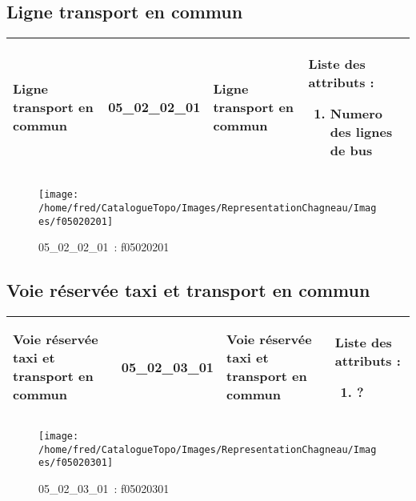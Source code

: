 \documentclass[12pt,titlepage]{book}
\begin{document}
\subsection{Ligne transport en commun}
\noindent
\vspace{\baselineskip}

\renewcommand{\arraystretch}{1.2}
\begin{supertabular}{|p{10cm}|c|p{13cm}|p{12cm}|}
 Ligne transport en commun & 05\_02\_02\_01 & Ligne transport en commun & Liste des attributs :
\begin{enumerate}
  \item Numero des lignes de bus\end{enumerate}
\\
\hline
\end{supertabular}
\begin{figure}[h!]
  \hfill         %
  \begin{minipage}[t]{3cm}
    \begin{center}
      \texttt{[image: /home/fred/CatalogueTopo/Images/RepresentationChagneau/Images/f05020201]}
      \caption[~05\_02\_02\_01]{\small{05\_02\_02\_01~:} \tiny{f05020201}}\label{f05020201}
    \end{center}
  \end{minipage}
\end{figure}


\subsection{Voie réservée taxi et transport en commun}
\noindent
\vspace{\baselineskip}

\renewcommand{\arraystretch}{1.2}
\begin{supertabular}{|p{10cm}|c|p{13cm}|p{12cm}|}
 Voie réservée taxi et transport en commun & 05\_02\_03\_01 & Voie réservée taxi et transport en commun & Liste des attributs :
\begin{enumerate}
  \item ?\end{enumerate}
\\
\hline
\end{supertabular}
\begin{figure}[h!]
  \hfill         %
  \begin{minipage}[t]{3cm}
    \begin{center}
      \texttt{[image: /home/fred/CatalogueTopo/Images/RepresentationChagneau/Images/f05020301]}
      \caption[~05\_02\_03\_01]{\small{05\_02\_03\_01~:} \tiny{f05020301}}\label{f05020301}
    \end{center}
  \end{minipage}
\end{figure}
\end{document}
